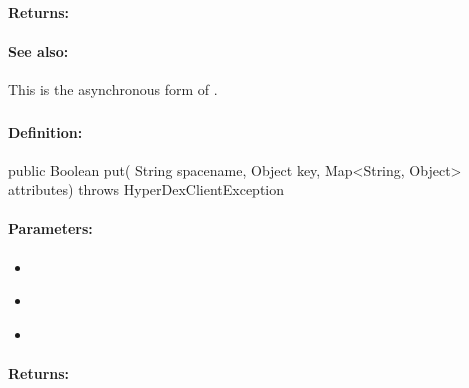 \paragraph{Returns:}


\paragraph{See also:}  This is the asynchronous form of .

\pagebreak
\subsubsection{}
\label{api:java:put}


\paragraph{Definition:}
\begin{javacode}
public Boolean put(
        String spacename,
        Object key,
        Map<String, Object> attributes) throws HyperDexClientException
\end{javacode}

\paragraph{Parameters:}
\begin{itemize}[noitemsep]
\item {}\\

\item {}\\

\item {}\\

\end{itemize}

\paragraph{Returns:}


\pagebreak
\subsubsection{}
\label{api:java:async_put}


